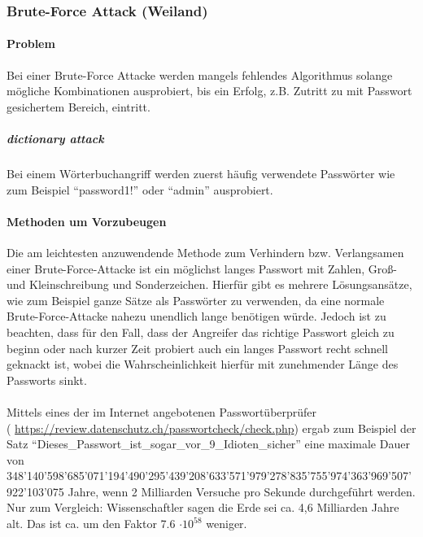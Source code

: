 \subsubsection{Brute-Force Attack (Weiland)}
\paragraph{Problem}
Bei einer Brute-Force Attacke werden mangels fehlendes Algorithmus solange mögliche Kombinationen ausprobiert, bis ein Erfolg, z.B. Zutritt zu mit Passwort gesichertem Bereich, eintritt.
\subparagraph{dictionary attack}
Bei einem Wörterbuchangriff werden zuerst häufig verwendete Passwörter wie zum Beispiel \enquote{password1!} oder \enquote{admin} ausprobiert. 
\paragraph{Methoden um Vorzubeugen}
Die am leichtesten anzuwendende Methode zum Verhindern bzw. Verlangsamen einer Brute-Force-Attacke ist ein möglichst langes Passwort mit Zahlen, Groß- und Kleinschreibung und Sonderzeichen. Hierfür gibt es mehrere Lösungsansätze, wie zum Beispiel ganze Sätze als Passwörter zu verwenden, da eine normale Brute-Force-Attacke nahezu unendlich lange benötigen würde. Jedoch ist zu beachten, dass für den Fall, dass der Angreifer das richtige Passwort gleich zu beginn oder nach kurzer Zeit probiert auch ein langes Passwort recht schnell geknackt ist, wobei die Wahrscheinlichkeit hierfür mit zunehmender Länge des Passworts sinkt.\\
\\
Mittels eines der im Internet angebotenen Passwortüberprüfer \\( \href{https://review.datenschutz.ch/passwortcheck/check.php}{https://review.datenschutz.ch/passwortcheck/check.php}) ergab zum Beispiel der Satz \enquote{Dieses\_Passwort\_ist\_sogar\_vor\_9\_Idioten\_sicher\!} eine maximale Dauer von\\ 348'140'598'685'071'194'490'295'439'208'633'571'979'278'835'755'974'363'969'507'922'103'075 Jahre, wenn 2 Milliarden Versuche pro Sekunde durchgeführt werden. Nur zum Vergleich: Wissenschaftler sagen die Erde sei ca. 4,6 Milliarden Jahre alt. Das ist ca. um den Faktor 7.6 $\cdot 10^{58}$ weniger.
